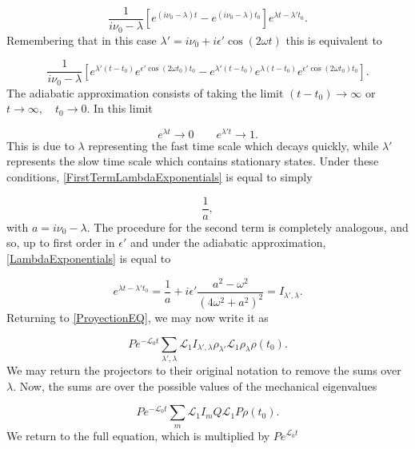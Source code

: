 \documentclass[reprint, amsmath,amssymb, aps,pra]{revtex4-1}
\begin{document}
\begin{equation}
\frac{1}{i\nu_0-\lambda}[e^{(i\nu_0-\lambda)t}-e^{(i\nu_0-\lambda)t_0}]e^{\lambda t - \lambda' t_0}.
\end{equation} Remembering that in this case $\lambda' = i\nu_0 + i \epsilon' \cos(2\omega t)$ this is equivalent to

\begin{equation}\label{FirstTermLambdaExponentials}
\frac{1}{i\nu_0-\lambda}[e^{\lambda'(t-t_0)}e^{\epsilon' \cos(2\omega t_0)t_0} -e^{\lambda'(t-t_0)}e^{\lambda(t-t_0)}e^{\epsilon' \cos(2\omega t_0)t_0}].
\end{equation} The adiabatic approximation consists of taking the limit $(t-t_0) \to \infty$ or $t \to \infty, \quad t_0 \to 0$. In this limit

\begin{equation}
e^{\lambda t} \to 0 \qquad e^{\lambda' t} \to 1.
\end{equation} This is due to $\lambda$ representing the fast time scale which decays quickly, while $\lambda'$ represents the slow time scale which contains stationary states. Under these conditions, \eqref{FirstTermLambdaExponentials} is equal to simply

\begin{equation}
\frac{1}{a},
\end{equation}  with $a = i\nu_0 - \lambda$. The procedure for the second term is completely analogous, and so, up to first order in $\epsilon'$ and under the adiabatic approximation, \eqref{LambdaExponentials} is equal to

\begin{equation}
[\int_{t_0}^t dt' e^{(\lambda'-\lambda)t'}]e^{\lambda t- \lambda't_0} = \frac{1}{a} + i\epsilon' \frac{a^2 - \omega^2}{(4\omega^2 + a^2)^2} = I_{\lambda',\lambda}.
\end{equation} Returning to \eqref{ProyectionEQ}, we may now write it as

\begin{equation}
Pe^{-\mathcal{L}_0 t} \sum_{\lambda',\lambda} \mathcal{L}_1 I_{\lambda',\lambda} \rho_{\lambda'} \mathcal{L}_1 \rho_\lambda \rho(t_0).
\end{equation} We may return the projectors to their original notation to remove the sums over $\lambda$.  Now, the sums are over the possible values of the mechanical eigenvalues 

\begin{equation}
Pe^{-\mathcal{L}_0 t} \sum_{m} \mathcal{L}_1 I_{m} Q \mathcal{L}_1 P \rho(t_0).
\end{equation} We return to the full equation, which is multiplied by $Pe^{\mathcal{L}_0 t}$ 
\end{document}
